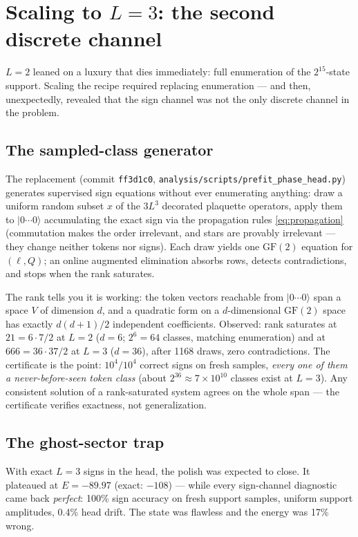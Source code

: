 \documentclass[11pt]{article}
\newcommand{\ket}[1]{|#1\rangle}
\newcommand{\GF}{\mathrm{GF}(2)}
\newcommand{\file}[1]{\texttt{#1}}
\begin{document}
\section{Scaling to $L=3$: the second discrete channel}
\label{sec:L3}

$L=2$ leaned on a luxury that dies immediately: full enumeration of the
$2^{15}$-state support. Scaling the recipe required replacing enumeration ---
and then, unexpectedly, revealed that the sign channel was not the only
discrete channel in the problem.

\subsection{The sampled-class generator}
\label{sec:sampled}

The replacement (commit \texttt{ff3d1c0}, \file{analysis/scripts/prefit\_phase\_head.py})
generates supervised sign equations without ever enumerating anything: draw a
uniform random subset $x$ of the $3L^3$ decorated plaquette operators, apply
them to $\ket{0\cdots0}$ accumulating the exact sign via the propagation
rules \eqref{eq:propagation} (commutation makes the order irrelevant, and
stars are provably irrelevant --- they change neither tokens nor signs). Each draw yields one $\GF$ equation for $(\ell,Q)$; an
online augmented elimination absorbs rows, detects contradictions, and stops
when the rank saturates.

The rank tells you it is working: the token vectors reachable from
$\ket{0\cdots0}$ span a space $V$ of dimension $d$, and a quadratic form on a
$d$-dimensional $\GF$ space has exactly $d(d+1)/2$ independent coefficients.
Observed: rank saturates at $21 = 6\cdot7/2$ at $L=2$ ($d=6$; $2^6=64$
classes, matching enumeration) and at $666 = 36\cdot37/2$ at $L=3$ ($d=36$),
after 1168 draws, zero contradictions. The certificate is the point:
$10^4/10^4$ correct signs on fresh samples, \emph{every one of them a
never-before-seen token class} (about $2^{36}\approx7\times10^{10}$ classes
exist at $L=3$). Any consistent solution of a rank-saturated system agrees on
the whole span --- the certificate verifies exactness, not generalization.

\subsection{The ghost-sector trap}
\label{sec:ghost}

With exact $L=3$ signs in the head, the polish was expected to close. It
plateaued at $E=-89.97$ (exact: $-108$) --- while every sign-channel diagnostic
came back \emph{perfect}: 100\% sign accuracy on fresh support samples,
uniform support amplitudes, 0.4\% head drift. The state was flawless and the
energy was 17\% wrong.
\end{document}
